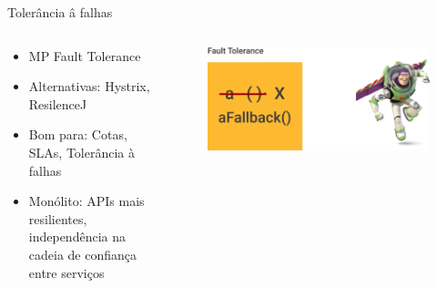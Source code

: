 \documentclass[aspectratio=169]{beamer}
\begin{document}
\begin{frame}{Tolerância â falhas}

\begin{columns}
    \begin{column}{0.7\textwidth}
\begin{itemize}
    \item MP Fault Tolerance
    \item Alternativas: Hystrix, ResilenceJ
    \item Bom para: Cotas, SLAs, Tolerância à falhas
    \item Monólito: APIs mais resilientes, independência na cadeia de confiança entre serviços
\end{itemize}
	\end{column}
	\begin{column}{0.4\textwidth}  %

\begin{figure}
	\centering
	\includegraphics[width=\linewidth]{Images/faulttolerance}
\end{figure}

	\end{column}
\end{columns}

\end{frame}
\end{document}
